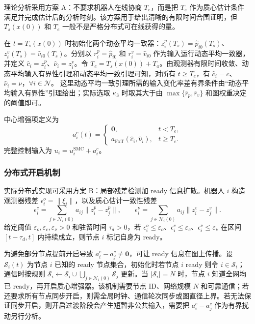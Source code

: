 理论分析采用方案 A：不要求机器人在线协商 $T_e$，而是把 $T_e$ 作为质心估计条件满足并完成估计后的分析时刻。该方案用于给出清晰的有限时间合围证明，但 $T_s(x(0))$ 和 $T_e$ 一般不是严格分布式可在线获得的量。

在 $t=T_s(x(0))$ 时初始化两个动态平均一致器：$z_i^p(T_s)=\hat p_{i0}(T_s)$、$z_i^v(T_s)=\hat v_{i0}(T_s)$。分别以 $r_i^p=\hat p_{i0}$ 和 $r_i^v=\hat v_{i0}$ 作为输入运行动态平均一致器，并定义 $\hat c_i=z_i^p$、$\hat\nu_i=z_i^v$。令 $T_e=T_s(x(0))+T_a$。由观测器有限时间收敛、动态平均输入有界性引理和动态平均一致引理可知，对所有 $t\geq T_e$，有 $\hat c_i=c$、$\hat\nu_i=\nu$，$\forall i\in\mathcal{N}$。
这里动态平均一致引理所需的输入变化率差有界条件由“动态平均输入有界性”引理给出；实际选取 $\kappa_3$ 时取其大于由 $\max\{\bar r_p,\bar r_v\}$ 和图权重决定的阈值即可。

中心增强项定义为
$$
a_i^c(t)=
\begin{cases}
\mathbf{0}, & t<T_e,\\
a_{\mathrm{FxT}}(\hat c_i,\hat\nu_i), & t\geq T_e.
\end{cases}
$$
完整控制输入为 $u_i=u_i^{\mathrm{SMC}}+a_i^c$。

\subsubsection{分布式开启机制}

实际分布式实现可采用方案 B：局部残差检测加 ready 信息扩散。机器人 $i$ 构造观测器残差 $\epsilon_i^o=\|\xi_i\|$，以及质心估计一致性残差
$$
\epsilon_i^c=\sum_{j\in\mathcal{N}_i(0)}a_{ij}\|z_i^p-z_j^p\|,\qquad
\epsilon_i^\nu=\sum_{j\in\mathcal{N}_i(0)}a_{ij}\|z_i^v-z_j^v\|.
$$
给定阈值 $\varepsilon_o,\varepsilon_c,\varepsilon_\nu>0$ 和驻留时间 $\tau_d>0$，若 $\epsilon_i^o\leq\varepsilon_o$、$\epsilon_i^c\leq\varepsilon_c$、$\epsilon_i^\nu\leq\varepsilon_\nu$ 在区间 $[t-\tau_d,t]$ 内持续成立，则节点 $i$ 标记自身为 ready。

为避免部分节点提前开启导致 $a_i^c-a_j^c\neq\mathbf{0}$，可让 ready 信息在图上传播。设 $\mathcal{S}_i(t)$ 为节点 $i$ 已知的 ready 节点集合，初始化时若节点 $i$ ready 则令 $i\in\mathcal{S}_i$；通信时按规则 $\mathcal{S}_i\leftarrow \mathcal{S}_i\cup\bigcup_{j\in\mathcal{N}_i(0)}\mathcal{S}_j$ 更新。当 $|\mathcal{S}_i|=N$ 时，节点 $i$ 知道全网均已 ready，再开启质心增强器。该机制需要节点 ID、网络规模 $N$ 和可靠通信；若还要求所有节点同步开启，则需全局时钟、通信轮次同步或图直径上界。若无法保证同步开启，则开启过渡阶段会产生短暂非公共输入，需要把 $a_i^c-a_j^c$ 作为有界扰动另行分析。

